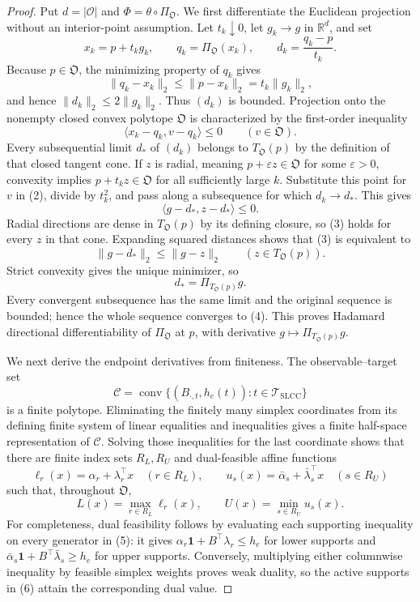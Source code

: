 \documentclass{article}
\begin{document}
\begin{proof}
Put \(d=|\mathcal O|\) and \(\Phi=\theta\circ\Pi_{\mathfrak O}\).  We first differentiate the Euclidean projection without an interior-point assumption.  Let \(t_k\downarrow0\), let \(g_k\to g\) in \(\mathbb R^d\), and set
\[
x_k=p+t_kg_k,
\qquad
q_k=\Pi_{\mathfrak O}(x_k),
\qquad
d_k=\frac{q_k-p}{t_k}.
\tag{1}
\]
Because \(p\in\mathfrak O\), the minimizing property of \(q_k\) gives
\[
\|q_k-x_k\|_2\leq\|p-x_k\|_2=t_k\|g_k\|_2,
\]
and hence \(\|d_k\|_2\leq2\|g_k\|_2\).  Thus \((d_k)\) is bounded.  Projection onto the nonempty closed convex polytope \(\mathfrak O\) is characterized by the first-order inequality
\[
\langle x_k-q_k,v-q_k\rangle\leq0
\qquad(v\in\mathfrak O).
\tag{2}
\]
Every subsequential limit \(d_*\) of \((d_k)\) belongs to \(T_{\mathfrak O}(p)\) by the definition of that closed tangent cone.  If \(z\) is radial, meaning \(p+\varepsilon z\in\mathfrak O\) for some \(\varepsilon>0\), convexity implies \(p+t_kz\in\mathfrak O\) for all sufficiently large \(k\).  Substitute this point for \(v\) in (2), divide by \(t_k^2\), and pass along a subsequence for which \(d_k\to d_*\).  This gives
\[
\langle g-d_*,z-d_*\rangle\leq0.
\tag{3}
\]
Radial directions are dense in \(T_{\mathfrak O}(p)\) by its defining closure, so (3) holds for every \(z\) in that cone.  Expanding squared distances shows that (3) is equivalent to
\[
\|g-d_*\|_2\leq\|g-z\|_2
\qquad(z\in T_{\mathfrak O}(p)).
\]
Strict convexity gives the unique minimizer, so
\[
d_*=\Pi_{T_{\mathfrak O}(p)}g.
\tag{4}
\]
Every convergent subsequence has the same limit and the original sequence is bounded; hence the whole sequence converges to (4).  This proves Hadamard directional differentiability of \(\Pi_{\mathfrak O}\) at \(p\), with derivative \(g\mapsto\Pi_{T_{\mathfrak O}(p)}g\).

We next derive the endpoint derivatives from finiteness.  The observable--target set
\[
\mathcal C=\operatorname{conv}\{(B_{\cdot,t},h_e(t)):t\in\mathcal T_{\mathrm{SLCC}}\}
\tag{5}
\]
is a finite polytope.  Eliminating the finitely many simplex coordinates from its defining finite system of linear equalities and inequalities gives a finite half-space representation of \(\mathcal C\).  Solving those inequalities for the last coordinate shows that there are finite index sets \(R_L,R_U\) and dual-feasible affine functions
\[
\ell_r(x)=\alpha_r+\lambda_r^{\top}x\quad(r\in R_L),
\qquad
u_s(x)=\bar\alpha_s+\bar\lambda_s^{\top}x\quad(s\in R_U)
\]
such that, throughout \(\mathfrak O\),
\[
L(x)=\max_{r\in R_L}\ell_r(x),
\qquad
U(x)=\min_{s\in R_U}u_s(x).
\tag{6}
\]
For completeness, dual feasibility follows by evaluating each supporting inequality on every generator in (5): it gives \(\alpha_r\mathbf 1+B^{\top}\lambda_r\leq h_e\) for lower supports and \(\bar\alpha_s\mathbf 1+B^{\top}\bar\lambda_s\geq h_e\) for upper supports.  Conversely, multiplying either columnwise inequality by feasible simplex weights proves weak duality, so the active supports in (6) attain the corresponding dual value.


\end{proof}
\end{document}
